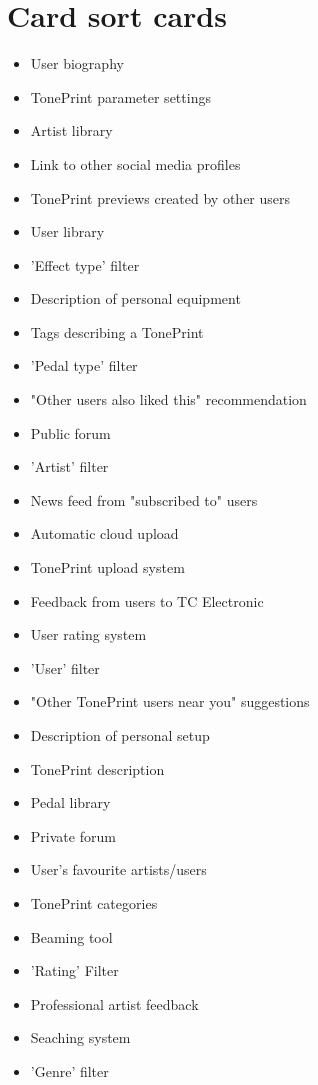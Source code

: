 \chapter{Card sort cards}
\label{App:CardSortCards}

\begin{itemize}
    \item User biography
    \item TonePrint parameter settings
    \item Artist library 
    \item Link to other social media profiles
    \item TonePrint previews created by other users
    \item User library
    \item 'Effect type' filter
    \item Description of personal equipment 
    \item Tags describing a TonePrint
    \item 'Pedal type' filter
    \item "Other users also liked this" recommendation
    \item Public forum
    \item 'Artist' filter
    \item News feed from "subscribed to" users
    \item Automatic cloud upload
    \item TonePrint upload system
    \item Feedback from users to TC Electronic
    \item User rating system
    \item 'User' filter
    \item "Other TonePrint users near you" suggestions
    \item Description of personal setup
    \item TonePrint description 
    \item Pedal library
    \item Private forum
    \item User's favourite artists/users
    \item TonePrint categories
    \item Beaming tool
    \item 'Rating' Filter
    \item Professional artist feedback
    \item Seaching system
    \item 'Genre' filter

\end{itemize}
